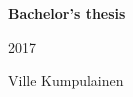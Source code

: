 \begin{titlepage}

    \vspace*{10em}
    \centering
    {\Huge\bfseries Bachelor's thesis\par}
    {\huge2017\par}
    \vfill

    \begin{minipage}{10cm}
    \begin{flushright}
        \Large
        Ville Kumpulainen
        \par
    \end{flushright}
    \end{minipage}

\end{titlepage}
